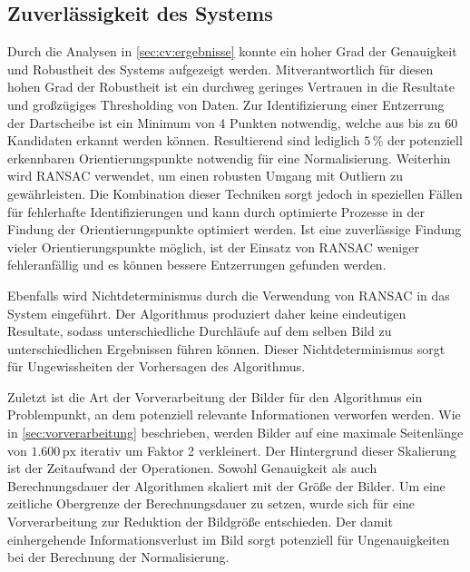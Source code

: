 
\subsection{Zuverlässigkeit des Systems}

Durch die Analysen in \autoref{sec:cv:ergebnisse} konnte ein hoher Grad der Genauigkeit und Robustheit des Systems aufgezeigt werden. Mitverantwortlich für diesen hohen Grad der Robustheit ist ein durchweg geringes Vertrauen in die Resultate und großzügiges Thresholding von Daten. Zur Identifizierung einer Entzerrung der Dartscheibe ist ein Minimum von 4 Punkten notwendig, welche aus bis zu 60 Kandidaten erkannt werden können. Resultierend sind lediglich $5\,\%$ der potenziell erkennbaren Orientierungspunkte notwendig für eine Normalisierung. Weiterhin wird RANSAC verwendet, um einen robusten Umgang mit Outliern zu gewährleisten. Die Kombination dieser Techniken sorgt jedoch in speziellen Fällen für fehlerhafte Identifizierungen und kann durch optimierte Prozesse in der Findung der Orientierungspunkte optimiert werden. Ist eine zuverlässige Findung vieler Orientierungspunkte möglich, ist der Einsatz von RANSAC weniger fehleranfällig und es können bessere Entzerrungen gefunden werden.

Ebenfalls wird Nichtdeterminismus durch die Verwendung von RANSAC in das System eingeführt. Der Algorithmus produziert daher keine eindeutigen Resultate, sodass unterschiedliche Durchläufe auf dem selben Bild zu unterschiedlichen Ergebnissen führen können. Dieser Nichtdeterminismus sorgt für Ungewissheiten der Vorhersagen des Algorithmus.

Zuletzt ist die Art der Vorverarbeitung der Bilder für den Algorithmus ein Problempunkt, an dem potenziell relevante Informationen verworfen werden. Wie in \autoref{sec:vorverarbeitung} beschrieben, werden Bilder auf eine maximale Seitenlänge von $1.600\,\text{px}$ iterativ um Faktor 2 verkleinert. Der Hintergrund dieser Skalierung ist der Zeitaufwand der Operationen. Sowohl Genauigkeit als auch Berechnungsdauer der Algorithmen skaliert mit der Größe der Bilder. Um eine zeitliche Obergrenze der Berechnungsdauer zu setzen, wurde sich für eine Vorverarbeitung zur Reduktion der Bildgröße entschieden. Der damit einhergehende Informationsverlust im Bild sorgt potenziell für Ungenauigkeiten bei der Berechnung der Normalisierung.

